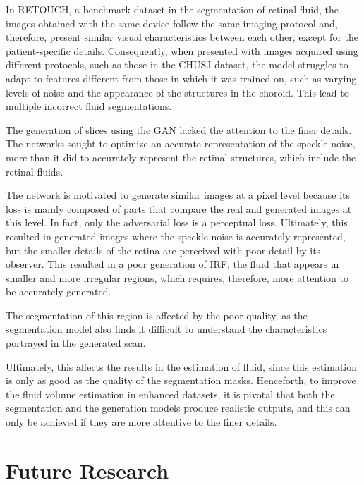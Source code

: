 \par
In RETOUCH, a benchmark dataset in the segmentation of retinal fluid, the images obtained with the same device follow the same imaging protocol and, therefore, present similar visual characteristics between each other, except for the patient-specific  details. Consequently, when presented with images acquired using different protocols, such as those in the CHUSJ dataset, the model struggles to adapt to features different from those in which it was trained on, such as varying levels of noise and the appearance of the structures in the choroid. This lead to multiple incorrect fluid segmentations.
\par
The generation of slices using the GAN lacked the attention to the finer details. The networks sought to optimize an accurate representation of the speckle noise, more than it did to accurately represent the retinal structures, which include the retinal fluids.
\par
The network is motivated to generate similar images at a pixel level because its loss is mainly composed of parts that compare the real and generated images at this level. In fact, only the adversarial loss is a perceptual loss. Ultimately, this resulted in generated images where the speckle noise is accurately represented, but the smaller details of the retina are perceived with poor detail by its observer. This resulted in a poor generation of IRF, the fluid that appears in smaller and more irregular regions, which requires, therefore, more attention to be accurately generated. 
\par
The segmentation of this region is affected by the poor quality, as the segmentation model also finds it difficult to understand the characteristics portrayed in the generated scan.
\par
Ultimately, this affects the results in the estimation of fluid, since this estimation is only as good as the quality of the segmentation masks. Henceforth, to improve the fluid volume estimation in enhanced datasets, it is pivotal that both the segmentation and the generation models produce realistic outputs, and this can only be achieved if they are more attentive to the finer details.

\section{Future Research}

